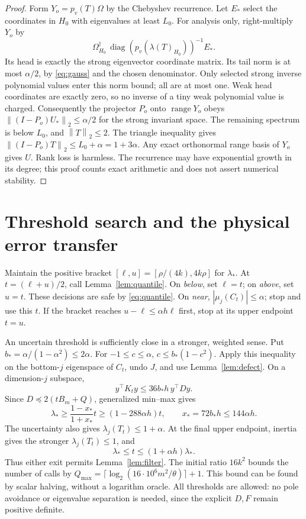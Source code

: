 \documentclass[11pt]{article}
\newcommand{\norm}[1]{\left\lVert#1\right\rVert}
\newcommand{\range}{\operatorname{range}}
\begin{document}
\begin{proof}
Form \(Y_o=p_v(T)\Omega\) by the Chebyshev recurrence. Let \(E_*\)
select the coordinates in \(H_0\) with eigenvalues at least \(L_0\).
For analysis only, right-multiply \(Y_o\) by
\[
 \Omega_{H_0}^\dagger\,
       \operatorname{diag}(p_v(\lambda(T)_{H_0}))^{-1}E_*.
\]
Its head is exactly the strong eigenvector coordinate matrix. Its tail
norm is at most \(\alpha/2\), by \eqref{eq:gauss} and the chosen denominator.
Only selected strong inverse polynomial values enter this norm bound;
all are at most one. Weak head coordinates are exactly zero, so no
inverse of a tiny weak polynomial value is charged.
Consequently the projector \(P_o\) onto \(\range Y_o\) obeys
\(\norm{(I-P_o)U_*}_2\leq\alpha/2\) for the strong invariant space.
The remaining spectrum is below \(L_0\), and \(\norm T_2\leq2\).
The triangle inequality gives
\(\norm{(I-P_o)T}_2\leq L_0+\alpha=1+3\alpha\).
Any exact orthonormal range basis of \(Y_o\) gives \(U\). Rank loss
is harmless. The recurrence may have exponential growth in its degree;
this proof counts exact arithmetic and does not assert numerical stability.
\end{proof}

\section{Threshold search and the physical error transfer}
Maintain the positive bracket \([\ell,u]=[\rho/(4k),4k\rho]\) for
\(\lambda_*\). At \(t=(\ell+u)/2\), call Lemma~\ref{lem:quantile}.
On \emph{below}, set \(\ell=t\); on \emph{above}, set \(u=t\).
These decisions are safe by \eqref{eq:quantile}.
On \emph{near}, \(|\mu_j(C_t)|\leq\alpha\);
stop and use this \(t\). If the bracket reaches
\(u-\ell\leq\alpha h\ell\) first, stop at its upper endpoint \(t=u\).

An uncertain threshold is sufficiently close in a stronger, weighted
sense. Put \(b_* =\alpha/(1-\alpha^2)\leq2\alpha\). For
\(-1\leq c\leq\alpha\),
\(c\leq b_*(1-c^2)\). Apply this inequality on the bottom-\(j\)
eigenspace of \(C_t\), undo \(J\), and use Lemma~\ref{lem:defect}.
On a dimension-\(j\) subspace,
\[
 y^\top K_ty\leq36b_*h\,y^\top Dy.
\]
Since \(D\preceq2(tB_m+Q)\), generalized min--max gives
\begin{equation}\label{eq:near}
 \lambda_*\geq\frac{1-x_*}{1+x_*}t
                \geq(1-288\alpha h)t,
 \qquad x_*=72b_*h\leq144\alpha h.
\end{equation}
The uncertainty also gives \(\lambda_j(T_t)\leq1+\alpha\).
At the final upper endpoint, inertia gives the stronger
\(\lambda_j(T_t)\leq1\), and
\begin{equation}\label{eq:upper}
 \lambda_*\leq t\leq(1+\alpha h)\lambda_*.
\end{equation}
Thus either exit permits Lemma~\ref{lem:filter}.
The initial ratio \(16k^2\) bounds the number of calls by
\(Q_{\max}=\lceil\log_2(16\cdot10^6m^2/\theta)\rceil+1\).
This bound can be found by scalar halving, without a logarithm oracle.
All thresholds are allowed: no pole avoidance or eigenvalue separation
is needed, since the explicit \(D,F\) remain positive definite.
\end{document}
